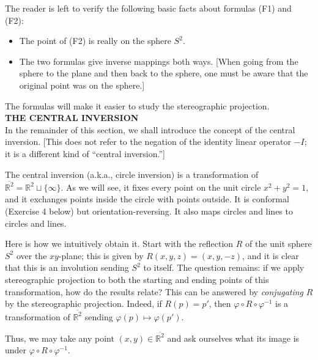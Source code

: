 \documentclass[leqno]{book}
\begin{document}
The reader is left to verify the following basic facts about formulas (F1) and (F2):
\begin{itemize}
\item The point of (F2) is really on the sphere $S^2$.

\item The two formulas give inverse mappings both ways.  [When going from the sphere to the plane and then back to the sphere, one must be aware that the original point was on the sphere.]
\end{itemize}
The formulas will make it easier to study the stereographic projection.\\

\noindent\textbf{THE CENTRAL INVERSION}\\

\noindent In the remainder of this section, we shall introduce the concept of the central inversion.  [This does not refer to the negation of the identity linear operator $-I$; it is a different kind of ``central inversion.'']

The central inversion (a.k.a., circle inversion) is a transformation of $\overline{\mathbb R^2}=\mathbb R^2\sqcup\{\infty\}$.  As we will see, it fixes every point on the unit circle $x^2+y^2=1$, and it exchanges points inside the circle with points outside.  It is conformal (Exercise 4 below) but orientation-reversing.  It also maps circles and lines to circles and lines.

Here is how we intuitively obtain it.  Start with the reflection $R$ of the unit sphere $S^2$ over the $xy$-plane; this is given by $R(x,y,z)=(x,y,-z)$, and it is clear that this is an involution sending $S^2$ to itself.  The question remains: if we apply stereographic projection to both the starting and ending points of this transformation, how do the results relate?  This can be answered by \emph{conjugating} $R$ by the stereographic projection.  Indeed, if $R(p)=p'$, then $\varphi\circ R\circ\varphi^{-1}$ is a transformation of $\overline{\mathbb R^2}$ sending $\varphi(p)\mapsto\varphi(p')$.

Thus, we may take any point $(x,y)\in\overline{\mathbb R^2}$ and ask ourselves what its image is under $\varphi\circ R\circ\varphi^{-1}$.
\end{document}

